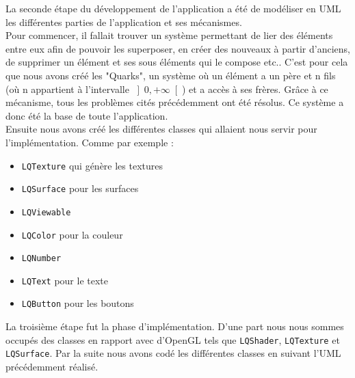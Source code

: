 \documentclass[twoside]{report}
\begin{document}
La seconde étape du développement de l'application a été de modéliser en UML les différentes parties de l'application et ses mécanismes. \\
Pour commencer, il fallait trouver un système permettant de lier des éléments entre eux afin de pouvoir les superposer, en créer des nouveaux à partir d'anciens, de supprimer un élément et ses sous éléments qui le compose etc..
C'est pour cela que nous avons créé les "Quarks", un système où un élément a un père et n fils (où n appartient à l'intervalle \(\left]0, +\infty\right[\)) et a accès à ses frères. Grâce à ce mécanisme, tous les problèmes cités précédemment ont été résolus. Ce système a donc été la base de toute l'application. \\
Ensuite nous avons créé les différentes classes qui allaient nous servir pour l'implémentation. Comme par exemple : 
\begin{itemize}[label=$-$]
    \item \verb!LQTexture! qui génère les textures
    \item \verb!LQSurface! pour les surfaces
    \item \verb!LQViewable! 
    \item \verb!LQColor! pour la couleur
    \item \verb!LQNumber! 
    \item \verb!LQText! pour le texte
    \item \verb!LQButton! pour les boutons 
\end{itemize}

La troisième étape fut la phase d'implémentation. D'une part nous nous sommes occupés des classes en rapport avec d'OpenGL tels que \verb!LQShader!, \verb!LQTexture! et \verb!LQSurface!.
Par la suite nous avons codé les différentes classes en suivant l'UML précédemment réalisé.
\end{document}
